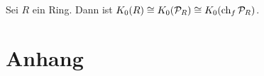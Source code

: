 \begin{proposition}
	Sei $R$ ein Ring.
	Dann ist $K_0(R) \cong K_0(\mathcal{P}_R) \cong K_0 (\operatorname{ch}_f \mathcal{P}_R)$.
\end{proposition}



\cleardoubleoddemptypage
{}
\setcounter{page}{1}
\cleardoubleoddemptypage
\appendix

\section{Anhang} %
\label{sec:anhang}

\printindex
\printbibliography
\listoffigures
\todototoc
{}

